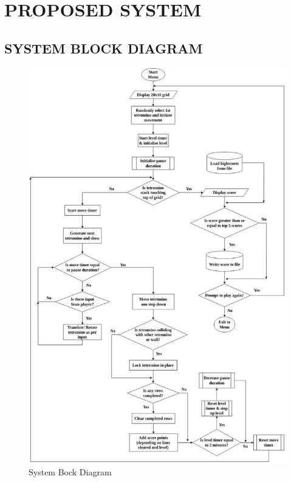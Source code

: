 	\newpage
	
\section{PROPOSED SYSTEM}
\subsection{SYSTEM BLOCK DIAGRAM}
\begin{figure}[H]
	\centering
	\includegraphics[width=\textwidth]{images/flowchart.jpg}
	\caption{System Bock Diagram}
\end{figure}
